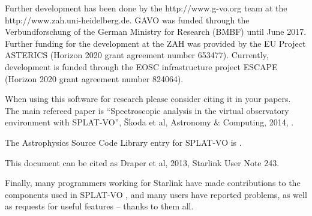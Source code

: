 \documentclass[twoside,11pt,nolof]{starlink}
\providecommand{\SPLAT}{\textsf{SPLAT-VO }}
\begin{document}
Further development has been done by the
 {http://www.g-vo.org} team at the
 {http://www.zah.uni-heidelberg.de}.
GAVO was funded through the Verbundforschung of the German Ministry for Research (BMBF) until June 2017.
Further funding for the development at  the ZAH was provided by the EU Project ASTERICS (Horizon 2020 grant agreement number 653477).  
Currently, development is funded through the EOSC infrastructure project ESCAPE (Horizon 2020 grant agreement number 824064).

When using this software for research please consider citing it in your papers. The main
refereed paper is ``Spectroscopic analysis in the virtual observatory environment with SPLAT-VO'',
\v{S}koda et al, Astronomy \& Computing, 2014,
.

The Astrophysics Source Code Library entry for SPLAT-VO is .

This document can be cited as Draper et al, 2013, Starlink User Note 243.

Finally, many programmers working for Starlink have made contributions to the
components used in \SPLAT, and many users have reported problems, as well as
requests for useful features -- thanks to them all.
\end{document}
